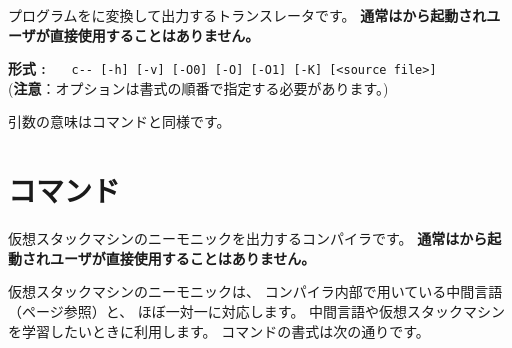 {\cmm}プログラムを{\cl}に変換して出力するトランスレータです。
{\bf 通常は{\cmc}から起動されユーザが直接使用することはありません。}

\begin{flushleft}
{\bf 形式 : }~~~\verb/c-- [-h] [-v] [-O0] [-O] [-O1] [-K] [<source file>]/\\
({\bf 注意}：オプションは書式の順番で指定する必要があります。)
\end{flushleft}


引数の意味は{\cmmc}コマンドと同様です。




\section{{\vcmmc}コマンド}
\label{command:vcmmc}

仮想スタックマシンのニーモニックを出力する{\cmm}コンパイラです。
{\bf 通常は{\cmv}から起動されユーザが直接使用することはありません。}

仮想スタックマシンのニーモニックは、
コンパイラ内部で用いている中間言語（\pageref{app:vm}ページ参照）と、
ほぼ一対一に対応します。
中間言語や仮想スタックマシンを学習したいときに利用します。
{\vcmmc}コマンドの書式は次の通りです。

